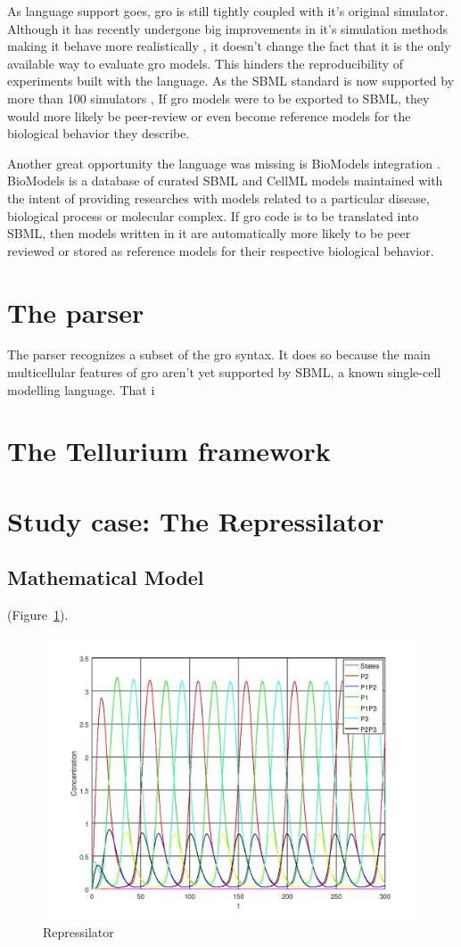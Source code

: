 \documentclass[12pt]{article}
\begin{document}
    As language support goes, gro is still tightly coupled with it's original simulator. Although it has recently undergone big improvements in it's simulation methods making it behave more realistically \cite{Gutirrez2017}, it doesn't change the fact that it is the only available way to evaluate gro models. This hinders the reproducibility of experiments built with the language. As the SBML standard is now supported by more than 100 simulators \cite{Hucka2007}, If gro models were to be exported to SBML, they would more likely be peer-review or even become reference models for the biological behavior they describe.
    
    Another great opportunity the language was missing is BioModels integration \cite{LeNovere2006}. BioModels is a database of curated SBML and CellML models maintained with the intent of providing researches with models related to a particular disease, biological process or molecular complex. If gro code is to be translated into SBML, then models written in it are automatically more likely to be peer reviewed or stored as reference models for their respective biological behavior.

\section{The parser}
    The parser recognizes a subset of the gro syntax. It does so because the main multicellular features of gro aren't yet supported by SBML, a known single-cell modelling language. That i

\section{The Tellurium framework}
    \lipsum[1]

\section{Study case: The Repressilator}
    \lipsum[1]

\subsection{Mathematical Model}
    \lipsum[1]
    \cite{Hucka2003}
    (Figure~\ref{fig:repressilator}).

\begin{figure}[ht]
\centering
\includegraphics[width=.5\textwidth]{repressilator.jpg}
\caption{Repressilator}
\label{fig:repressilator}
\end{figure}
\end{document}
